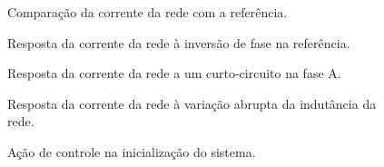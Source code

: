 	\begin{figure}[!htb]
    \centering
      \def\svgwidth{\textwidth}
      
    \renewcommand\figurename{Fig.}
    \caption{Comparação da corrente da rede com a referência.}
    \label{fig:i2_sim_ini}
  \end{figure}


  \begin{minipage}{\textwidth}
    \makebox[\textwidth]{
      \centering
      \def\svgwidth{\textwidth}
      }
    \label{fig:i2_simulacao_degrau}
  \end{minipage}

  \begin{figure}[!htb]
    \centering
      \def\svgwidth{\textwidth}
      
    \renewcommand\figurename{Fig.}
    \caption{Resposta da corrente da rede à inversão de fase na referência.}
    \label{fig:i2_simulacao_fase}
  \end{figure}

  \begin{figure}[!htb]
    \centering
      \def\svgwidth{\textwidth}
      
    \renewcommand\figurename{Fig.}
    \caption{Resposta da corrente da rede a um curto-circuito na fase A.}
    \label{fig:i2_simulacao_curto}
  \end{figure}

  \begin{figure}[!htb]
    \centering
      \def\svgwidth{\textwidth}
      
    \renewcommand\figurename{Fig.}
    \caption{Resposta da corrente da rede à variação abrupta da indutância da rede.}
    \label{fig:i2_simulacao_L_rede}
  \end{figure}

  \begin{figure}[!h]
    \centering
      \def\svgwidth{\textwidth}
      
    \renewcommand\figurename{Fig.}
    \caption{Ação de controle na inicialização do sistema.}
    \label{fig:up_simulacao_ini}
  \end{figure}

